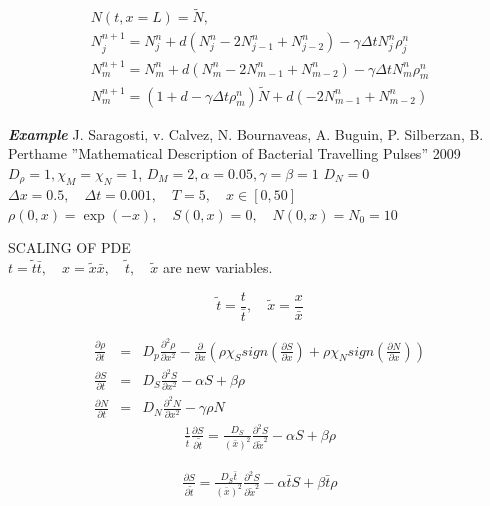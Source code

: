 \documentclass[11pt,twoside]{article}
\numberwithin{equation}{section}
\theoremstyle{plain}
\theoremstyle{nonumberplain}
\begin{document}
\begin{eqnarray}
N(t,x=L)= \tilde{N}, \\
N_j^{n+1}=N_j^n+d(N^n_{j}-2N_{j-1}^n+N_{j-2}^n)-\gamma \Delta t N_j^n \rho_j^n\\
N_m^{n+1}=N_m^n+d(N^n_{m}-2N_{m-1}^n+N_{m-2}^n)-\gamma \Delta t N_m^n \rho_m^n\\
N_m^{n+1}=(1+d-\gamma \Delta t\rho_m^n)\tilde{N}+d(-2N^n_{m-1}+N_{m-2}^n)
\end{eqnarray}


\textbf{\textit{Example}} J. Saragosti, v. Calvez, N. Bournaveas, A. Buguin, P. Silberzan, B. Perthame ''Mathematical Description of Bacterial Travelling Pulses'' 2009\\
$D_{\rho}=1, \chi_M=\chi_N=1$,  $D_M=2,\alpha=0.05,\gamma=\beta=1 $  $D_N=0$ \\
$\Delta x=0.5,\quad \Delta t=0.001,\quad T=5, \quad x\in[0,50]$\\

$\rho(0,x)=\exp(-x),\quad S(0,x)=0,\quad N(0,x)=N_0=10$\\
\fi

\iffalse
SCALING OF PDE\\

$t=\tilde{t} \bar{t}, \quad x=\tilde{x}\bar{x},\quad  \tilde{t},\quad \tilde{x}$ are new variables.

$$
\tilde{t}=\frac{t}{\bar{t}}, \quad \tilde{x}=\frac{x}{\bar{x}}
$$

\begin{eqnarray}
\frac{\partial \rho}{\partial t}&=&D_p\frac{\partial^2 \rho}{\partial x^2}-\frac{\partial}{\partial x}\left( \rho \chi_S sign(\frac{\partial S}{\partial x})+\rho \chi_N sign(\frac{\partial N}{\partial x})\right) \\
\frac{\partial S}{\partial t}&=&D_S \frac{\partial^2S}{\partial x^2}-\alpha S+\beta \rho\\
\frac{\partial N}{\partial t}&=&D_N \frac{\partial^2N}{\partial x^2}-\gamma \rho N
\end{eqnarray}
\begin{eqnarray*}
\frac{1}{\bar{t}}\frac{\partial S}{\partial\tilde{t}}=\frac{D_S}{(\bar{x})^2}\frac{\partial^2S}{\partial \tilde{x}^2}-\alpha S+\beta \rho
\end{eqnarray*}

\begin{eqnarray}
\frac{\partial S}{\partial\tilde{t}}=\frac{D_S\bar{t}}{(\bar{x})^2}\frac{\partial^2S}{\partial \tilde{x}^2}-\alpha\bar{t} S+\beta \bar{t}\rho
\end{eqnarray}
\end{document}
